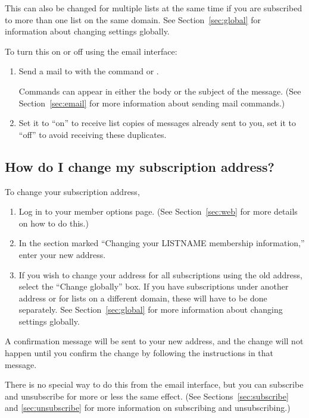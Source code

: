 \documentclass{howto}
\begin{document}
This can also be changed for multiple lists at the same time if you are subscribed to 
more than one list on the same domain.  See Section~\ref{sec:global} for 
information about changing settings globally.

To turn this on or off using the email interface:
\begin{enumerate}
   \item Send a mail to  with the command
    or .

   Commands can appear
   in either the body or the subject of the message.  (See
   Section~\ref{sec:email} for more information about sending mail
   commands.)
	\item Set it to ``on'' to receive list copies of messages already sent
	to you, set it to ``off'' to avoid receiving these duplicates.
\end{enumerate}


\subsection{How do I change my subscription address?\label{sec:changeaddress}}
To change your subscription address, 
\begin{enumerate}
	\item Log in to your member options page.  (See Section~\ref{sec:web} 
	for more details on how to do this.)
	\item In the section marked ``Changing your LISTNAME membership information,''
	enter your new address.
	\item If you wish to change your address for all subscriptions using the 
	old address, select the ``Change globally'' box.  If you have subscriptions
	under another address or for lists on a different domain, these will have
	to be done separately. See Section~\ref{sec:global} for more
	information about changing settings globally.
\end{enumerate}

A confirmation message will be sent to your new address, and the change will
not happen until you confirm the change by following the instructions in that
message.

There is no special way to do this from the email interface, but you can 
subscribe and unsubscribe for more or less the same effect.  (See 
Sections~\ref{sec:subscribe} and \ref{sec:unsubscribe} for more information
on subscribing and unsubscribing.)
\end{document}
